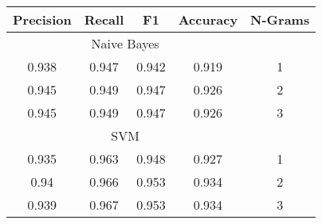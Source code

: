  \begin{tabular}{cccc | c}  \hline Precision & Recall & F1 & Accuracy & N-Grams \\  \hline \multicolumn{4}{c|}{Naive Bayes} &  \\ 0.938 & 0.947 & 0.942 & 0.919 & 1  \\  0.945 & 0.949 & 0.947 & 0.926 & 2  \\  0.945 & 0.949 & 0.947 & 0.926 & 3  \\  \hline \multicolumn{4}{c|}{SVM} &  \\ 0.935 & 0.963 & 0.948 & 0.927 & 1  \\  0.94 & 0.966 & 0.953 & 0.934 & 2  \\  0.939 & 0.967 & 0.953 & 0.934 & 3  \\  \hline \end{tabular}